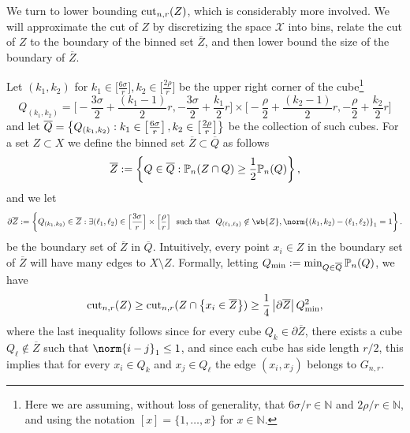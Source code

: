 	We turn to lower bounding $\mathrm{cut}_{n,r}(Z)$, which is considerably more involved. We will approximate the cut of $Z$ by discretizing the space $\mathcal{X}$ into bins, relate the cut of $Z$ to the boundary of the binned set $\overline{Z}$, and then lower bound the size of the boundary of $\overline{Z}$.
	
	Let $(k_1,k_2)$ for $k_1 \in \bigl[\frac{6\sigma}{r}\bigr], k_2 \in \bigl[\frac{2\rho}{r}\bigr]$ be the upper right  corner of the cube\footnote{Here we are assuming, without loss of generality, that $6\sigma/r \in \mathbb{N}$ and $2\rho/r \in \mathbb{N}$, and using the notation $[x] = \{1,\ldots,x\}$ for $x \in \mathbb{N}$.}
	\begin{equation*}
	Q_{(k_1,k_2)} = \biggl[-\frac{3\sigma}{2} + \frac{(k_1 - 1)}{2}r, -\frac{3\sigma}{2} + \frac{k_1}{2}r\biggr] \times \biggl[-\frac{\rho}{2} + \frac{(k_2 - 1)}{2}r, -\frac{\rho}{2} + \frac{k_2}{2}r\biggr]
	\end{equation*}
	and let $\overline{Q} = \left\{Q_{(k_1,k_2)}: k_1 \in \left[\frac{6\sigma}{r}\right], k_2 \in \bigl[\frac{2\rho}{r}\bigr]\right\}$ be the collection of such cubes. For a set $Z \subset X$ we define the binned set $\overline{Z} \subset \overline{Q}$ as follows
	\begin{equation*}
	\overline{Z} := \left\{Q \in \overline{Q}: \mathbb{P}_n(Z \cap Q) \geq \frac{1}{2}\mathbb{P}_n(Q)\right\},
	\end{equation*}
	and we let 
	\begin{equation*}
	\partial \overline{Z} := \set{Q_{(k_1,k_2)} \in \overline{Z}: \exists (\ell_1,\ell_2) \in \Bigl[\frac{3\sigma}{r}\Bigr] \times \Bigl[\frac{\rho}{r}\Bigr]~~\textrm{such that}~~Q_{(\ell_1,\ell_2)} \not\in \wb{Z}, \norm{(k_1,k_2) - (\ell_1,\ell_2)}_1 = 1}.
	\end{equation*}
	be the boundary set of $\overline{Z}$ in $\overline{Q}$. Intuitively, every point $x_i \in Z$ in the boundary set of $\overline{Z}$ will have many edges to $X\setminus Z$. Formally, letting $Q_{\min} := \min_{Q \in \overline{Q}} \mathbb{P}_n(Q)$, we have
	\begin{equation}
	\label{eqn:normalized_cut_lb_pf1}
	\mathrm{cut}_{n,r}(Z) \geq \mathrm{cut}_{n,r}(Z \cap \left\{x_i \in \overline{Z}\right\}) \geq \frac{1}{4} \left \lvert \partial \overline{Z} \right \rvert Q_{\min}^2,
	\end{equation}
	where the last inequality follows since for every cube $Q_k \in \partial\overline{Z}$, there exists a cube $Q_\ell \not\in \overline{Z}$ such that $\norm{i - j}_1 \leq 1$, and since each cube has side length $r/2$, this implies that for every $x_i \in Q_k$ and $x_j \in Q_\ell$ the edge $(x_i,x_j)$ belongs to $G_{n,r}$. 
	

